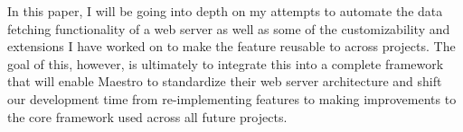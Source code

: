In this paper, I will be going into depth on my attempts to automate the data fetching functionality of a web server as well as some of the customizability and extensions I have worked on to make the feature reusable to across projects.  The goal of this, however, is ultimately to integrate this into a complete framework that will enable Maestro to standardize their web server architecture and shift our development time from re-implementing features to making improvements to the core framework used across all future projects. 